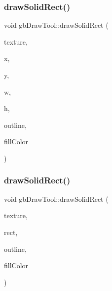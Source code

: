 \mbox{\label{classgb_draw_tool_a1f6f3a450894c006786e4e29737a196f}} 
\subsubsection{\texorpdfstring{drawSolidRect()}{drawSolidRect()}\hspace{0.1cm}{\footnotesize\ttfamily [1/2]}}
{\footnotesize\ttfamily void gb\+Draw\+Tool\+::draw\+Solid\+Rect (\begin{DoxyParamCaption}\item[{S\+D\+L\+\_\+\+Texture $\ast$}]{texture,  }\item[{int}]{x,  }\item[{int}]{y,  }\item[{int}]{w,  }\item[{int}]{h,  }\item[{\mbox{\hyperlink{classgb_color}{gb\+Color}}}]{outline,  }\item[{\mbox{\hyperlink{classgb_color}{gb\+Color}}}]{fill\+Color }\end{DoxyParamCaption})}

\mbox{\label{classgb_draw_tool_afebe0e6d5fe84875bef45c79390cd9f6}} 
\subsubsection{\texorpdfstring{drawSolidRect()}{drawSolidRect()}\hspace{0.1cm}{\footnotesize\ttfamily [2/2]}}
{\footnotesize\ttfamily void gb\+Draw\+Tool\+::draw\+Solid\+Rect (\begin{DoxyParamCaption}\item[{S\+D\+L\+\_\+\+Texture $\ast$}]{texture,  }\item[{\mbox{\hyperlink{classgb_rect}{gb\+Rect}}}]{rect,  }\item[{\mbox{\hyperlink{classgb_color}{gb\+Color}}}]{outline,  }\item[{\mbox{\hyperlink{classgb_color}{gb\+Color}}}]{fill\+Color }\end{DoxyParamCaption})}

\mbox{\label{classgb_draw_tool_a5e511da5367f80b3fbdf005639977b65}} 
